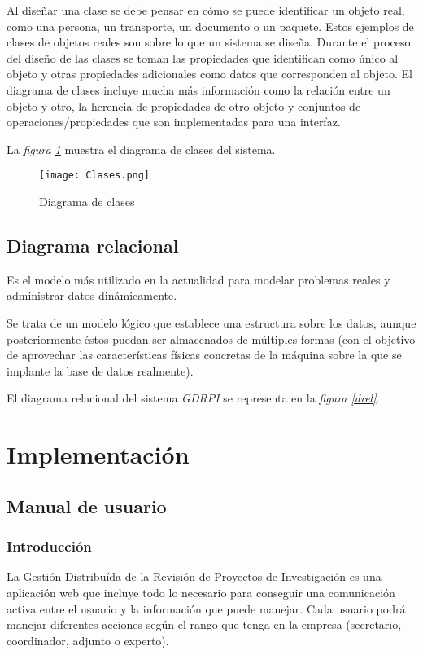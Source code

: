 \documentclass[11pt,a4paper,spanish,twoside]{book}
\begin{document}
Al diseñar una clase se debe pensar en cómo se puede identificar un objeto
real, como una persona, un transporte, un documento o un paquete. Estos
ejemplos de clases de objetos reales son sobre lo que un sistema se
diseña. Durante el proceso del diseño de las clases se toman las propiedades
que identifican como único al objeto y otras propiedades adicionales como
datos que corresponden al objeto. El diagrama de clases incluye mucha más
información como la relación entre un objeto y otro, la herencia de
propiedades de otro objeto y conjuntos de operaciones/propiedades que son
implementadas para una interfaz.

La \emph{figura \ref{dclases}} muestra el diagrama de clases del sistema.

\begin{sidewaystable}
\begin{figure}[H]
  \begin{center}
    \texttt{[image: Clases.png]}
    \caption{Diagrama de clases}
    \label{dclases}
  \end{center}
\end{figure}
\end{sidewaystable}
\chapter{Diagrama relacional}
Es el modelo más utilizado en la actualidad para modelar problemas reales y 
administrar datos dinámicamente.

Se trata de un modelo lógico que establece una estructura sobre los datos,
aunque posteriormente éstos puedan ser almacenados de múltiples formas (con
el objetivo de aprovechar las características físicas concretas de la máquina
sobre la que se implante la base de datos realmente).

El diagrama relacional del sistema \emph{GDRPI} se representa en la
\emph{figura \ref{drel}}.


\part{Implementación}
\chapter{Manual de usuario}
\section{Introducción}
La Gestión Distribuída de la Revisión de Proyectos de Investigación es una
aplicación web que incluye todo lo necesario para conseguir una comunicación 
activa entre el usuario y la información que puede manejar. Cada usuario podrá 
manejar diferentes acciones según el rango que tenga en la empresa (secretario,
coordinador, adjunto o experto).
\end{document}
